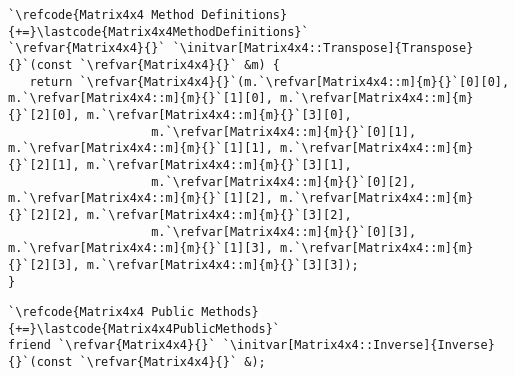 \begin{lstlisting}
`\refcode{Matrix4x4 Method Definitions}{+=}\lastcode{Matrix4x4MethodDefinitions}`
`\refvar{Matrix4x4}{}` `\initvar[Matrix4x4::Transpose]{Transpose}{}`(const `\refvar{Matrix4x4}{}` &m) {
   return `\refvar{Matrix4x4}{}`(m.`\refvar[Matrix4x4::m]{m}{}`[0][0], m.`\refvar[Matrix4x4::m]{m}{}`[1][0], m.`\refvar[Matrix4x4::m]{m}{}`[2][0], m.`\refvar[Matrix4x4::m]{m}{}`[3][0],
                    m.`\refvar[Matrix4x4::m]{m}{}`[0][1], m.`\refvar[Matrix4x4::m]{m}{}`[1][1], m.`\refvar[Matrix4x4::m]{m}{}`[2][1], m.`\refvar[Matrix4x4::m]{m}{}`[3][1],
                    m.`\refvar[Matrix4x4::m]{m}{}`[0][2], m.`\refvar[Matrix4x4::m]{m}{}`[1][2], m.`\refvar[Matrix4x4::m]{m}{}`[2][2], m.`\refvar[Matrix4x4::m]{m}{}`[3][2],
                    m.`\refvar[Matrix4x4::m]{m}{}`[0][3], m.`\refvar[Matrix4x4::m]{m}{}`[1][3], m.`\refvar[Matrix4x4::m]{m}{}`[2][3], m.`\refvar[Matrix4x4::m]{m}{}`[3][3]);
}
\end{lstlisting}

\begin{lstlisting}
`\refcode{Matrix4x4 Public Methods}{+=}\lastcode{Matrix4x4PublicMethods}`
friend `\refvar{Matrix4x4}{}` `\initvar[Matrix4x4::Inverse]{Inverse}{}`(const `\refvar{Matrix4x4}{}` &);
\end{lstlisting}
